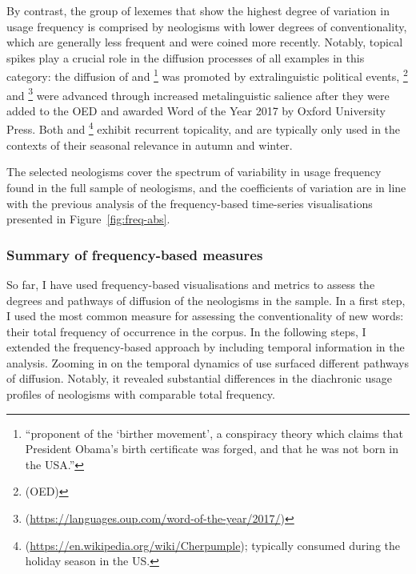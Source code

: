 \documentclass[
  a4paper,
  abstract=on,
  captions=tableabove
  ]{scrartcl}
\begin{document}
      By contrast, the group of lexemes that show the highest degree of variation in usage frequency is comprised by neologisms with lower degrees of conventionality, which are generally less frequent and were coined more recently. Notably, topical spikes play a crucial role in the diffusion processes of all examples in this category: the diffusion of  and \footnote{\enquote{proponent of the \enquote{birther movement}, a conspiracy theory which claims that President Obama's birth certificate was forged, and that he was not born in the USA.}} was promoted by extralinguistic political events, \footnote{ (OED)} and \footnote{ (\url{https://languages.oup.com/word-of-the-year/2017/})} were advanced through increased metalinguistic salience after they were added to the OED and awarded Word of the Year 2017 by Oxford University Press. Both  and \footnote{ (\url{https://en.wikipedia.org/wiki/Cherpumple}); typically consumed during the holiday season in the US.} exhibit recurrent topicality, and are typically only used in the contexts of their seasonal relevance in autumn and winter.

      The selected neologisms cover the spectrum of variability in usage frequency found in the full sample of neologisms, and the coefficients of variation are in line with the previous analysis of the frequency-based time-series visualisations presented in Figure~\ref{fig:freq-abs}.


      \subsubsection{Summary of frequency-based measures}

        So far, I have used frequency-based visualisations and metrics to assess the degrees and pathways of diffusion of the neologisms in the sample. In a first step, I used the most common measure for assessing the conventionality of new words: their total frequency of occurrence in the corpus. In the following steps, I extended the frequency-based approach by including temporal information in the analysis. Zooming in on the temporal dynamics of use surfaced different pathways of diffusion. Notably, it revealed substantial differences in the diachronic usage profiles of neologisms with comparable total frequency.
\end{document}

